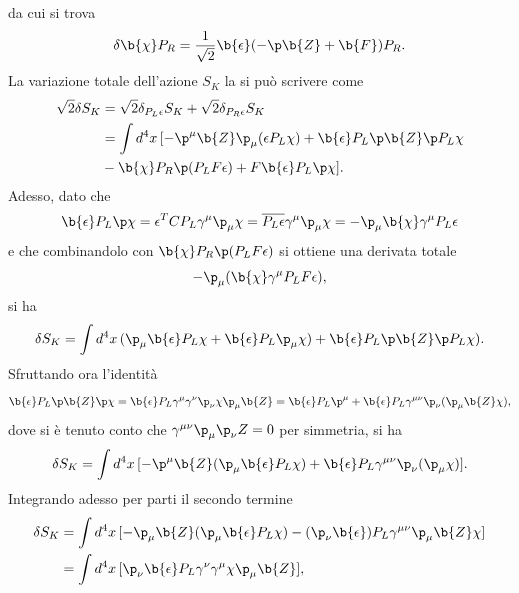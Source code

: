 da cui si trova 
\begin{equation}
    \delta \b{\chi}P_R = \frac{1}{\sqrt{2}}\b{\epsilon}(-\p\b{Z} + \b{F})P_R.
\end{equation}
La variazione totale dell'azione $S_K$ la si può scrivere come 
\begin{equation}
    \begin{split}
        \sqrt{2}\delta S_K &= \sqrt{2}\delta_{P_L\epsilon} S_K + \sqrt{2}\delta_{P_R\epsilon} S_K \\
        &= \int d^4x\,[-\p^\mu \b{Z}\p_\mu(\epsilon P_L\chi) + \b{\epsilon}P_L\sl{\p}\b{Z}\sl{\p}P_L\chi \\
        &- \b{\chi}P_R\sl{\p}(P_LF\epsilon) + F\b{\epsilon}P_L\sl{\p}\chi].
    \end{split} 
\end{equation}
Adesso, dato che 
\begin{equation}
    \b{\epsilon}P_L\sl{\p}\chi = \epsilon^TCP_L\gamma^\mu\p_\mu\chi = \overline{P_L\epsilon}\gamma^\mu\p_\mu\chi = -\p_\mu\b{\chi}\gamma^\mu P_L\epsilon
\end{equation}
e che combinandolo con $\b{\chi}P_R\sl{\p}(P_LF\epsilon)$ si ottiene una derivata totale
\begin{equation}
    -\p_\mu(\b{\chi}\gamma^\mu P_LF\epsilon),
\end{equation}
si ha 
\begin{equation}
    \delta S_K = \int d^4x\,(\p_\mu \b{\epsilon}P_L\chi + \b{\epsilon}P_L\p_\mu\chi) + \b{\epsilon}P_L\sl{\p}\b{Z}\sl{\p}P_L\chi).
\end{equation}
Sfruttando ora l'identità
\begin{equation}
    \b{\epsilon}P_L\sl{\p}\b{Z}\sl{\p}\chi = \b{\epsilon}P_L\gamma^\mu\gamma^\nu\p_\nu\chi\p_\mu\b{Z} = \b{\epsilon}P_L\p^\mu + \b{\epsilon}P_L\gamma^{\mu\nu}\p_\nu(\p_\mu \b{Z}\chi),
\end{equation}
dove si è tenuto conto che $\gamma^{\mu\nu}\p_\mu\p_\nu Z = 0$ per simmetria, si ha 
\begin{equation}
    \delta S_K = \int d^4x\,[-\p^\mu\b{Z}(\p_\mu\b{\epsilon}P_L\chi) + \b{\epsilon}P_L\gamma^{\mu\nu}\p_\nu(\p_\mu\chi)].
\end{equation}
Integrando adesso per parti il secondo termine 
\begin{equation}
    \begin{split}
        \delta S_K &= \int d^4x\,[-\p_\mu\b{Z}(\p_\mu\b{\epsilon}P_L\chi) - (\p_\nu\b{\epsilon})P_L\gamma^{\mu\nu}\p_\mu\b{Z}\chi] \\
        &= \int d^4x\, [\p_\nu\b{\epsilon}P_L\gamma^\nu\gamma^\mu\chi\p_\mu\b{Z}], 
    \end{split}
\end{equation}
